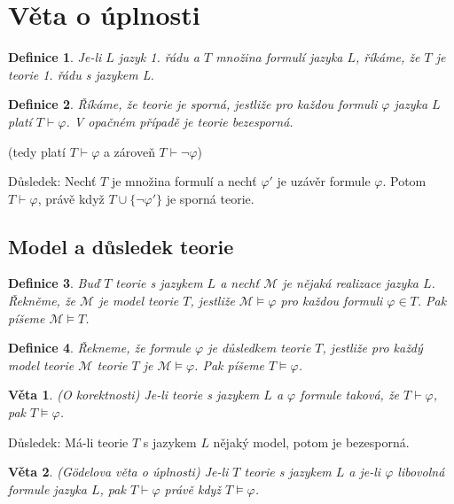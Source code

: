 \documentclass[a4paper, 11pt]{report}
\newtheorem{mydef}{Definice}[chapter]
\newtheorem{veta}{Věta}[chapter]
\begin{document}
\section{Věta o úplnosti}

\begin{mydef}
Je-li $L$ jazyk 1. řádu a $T$ množina formulí jazyka $L$, říkáme, že $T$ je \emph{teorie 1. řádu} s jazykem L.
\end{mydef}

\begin{mydef}
Říkáme, že teorie je \emph{sporná}, jestliže pro každou formuli $\varphi$ jazyka $L$ platí $T \vdash \varphi$. V opačném případě je teorie \emph{bezesporná}.
\end{mydef}
(tedy platí $T \vdash \varphi$ a zároveň $T \vdash \lnot \varphi$)

Důsledek: Nechť $T$ je množina formulí a nechť $\varphi'$ je uzávěr formule $\varphi$. Potom $T \vdash \varphi$, právě když $T \cup \{\lnot \varphi'\}$ je sporná teorie.

\subsection{Model a důsledek teorie}

\begin{mydef}
Buď $T$ teorie s jazykem $L$ a nechť $\mathcal{M}$ je nějaká realizace jazyka $L$. Řekněme, že $\mathcal{M}$ je model teorie $T$, jestliže $\mathcal{M} \models \varphi$ pro každou formuli $\varphi \in T$. Pak píšeme $\mathcal{M} \models T$.
\end{mydef}

\begin{mydef}
Řekneme, že formule $\varphi$ je \emph{důsledkem teorie $T$}, jestliže pro každý model teorie $\mathcal{M}$ teorie $T$ je $\mathcal{M} \models \varphi$. Pak píšeme $T \models \varphi$.
\end{mydef}

\begin{veta}
(O korektnosti) Je-li teorie s jazykem $L$ a $\varphi$ formule taková, že $T \vdash \varphi$, pak $T \models \varphi$.
\end{veta}

Důsledek: Má-li teorie $T$ s jazykem $L$ nějaký model, potom je bezesporná.

\begin{veta}
(Gödelova věta o úplnosti) Je-li $T$ teorie s jazykem $L$ a je-li $\varphi$ libovolná formule jazyka $L$, pak $T \vdash \varphi$ právě když $T \models \varphi$.
\end{veta}
\end{document}

